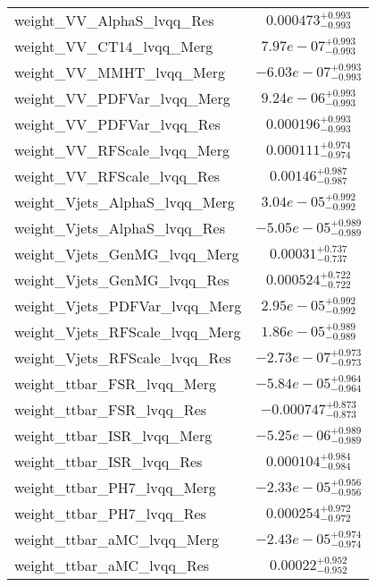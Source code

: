 \begin{tabular}{|l|c|}
weight\_VV\_AlphaS\_lvqq\_Res & $0.000473^{+0.993}_{-0.993}$ \\
weight\_VV\_CT14\_lvqq\_Merg & $7.97e-07^{+0.993}_{-0.993}$ \\
weight\_VV\_MMHT\_lvqq\_Merg & $-6.03e-07^{+0.993}_{-0.993}$ \\
weight\_VV\_PDFVar\_lvqq\_Merg & $9.24e-06^{+0.993}_{-0.993}$ \\
weight\_VV\_PDFVar\_lvqq\_Res & $0.000196^{+0.993}_{-0.993}$ \\
weight\_VV\_RFScale\_lvqq\_Merg & $0.000111^{+0.974}_{-0.974}$ \\
weight\_VV\_RFScale\_lvqq\_Res & $0.00146^{+0.987}_{-0.987}$ \\
weight\_Vjets\_AlphaS\_lvqq\_Merg & $3.04e-05^{+0.992}_{-0.992}$ \\
weight\_Vjets\_AlphaS\_lvqq\_Res & $-5.05e-05^{+0.989}_{-0.989}$ \\
weight\_Vjets\_GenMG\_lvqq\_Merg & $0.00031^{+0.737}_{-0.737}$ \\
weight\_Vjets\_GenMG\_lvqq\_Res & $0.000524^{+0.722}_{-0.722}$ \\
weight\_Vjets\_PDFVar\_lvqq\_Merg & $2.95e-05^{+0.992}_{-0.992}$ \\
weight\_Vjets\_RFScale\_lvqq\_Merg & $1.86e-05^{+0.989}_{-0.989}$ \\
weight\_Vjets\_RFScale\_lvqq\_Res & $-2.73e-07^{+0.973}_{-0.973}$ \\
weight\_ttbar\_FSR\_lvqq\_Merg & $-5.84e-05^{+0.964}_{-0.964}$ \\
weight\_ttbar\_FSR\_lvqq\_Res & $-0.000747^{+0.873}_{-0.873}$ \\
weight\_ttbar\_ISR\_lvqq\_Merg & $-5.25e-06^{+0.989}_{-0.989}$ \\
weight\_ttbar\_ISR\_lvqq\_Res & $0.000104^{+0.984}_{-0.984}$ \\
weight\_ttbar\_PH7\_lvqq\_Merg & $-2.33e-05^{+0.956}_{-0.956}$ \\
weight\_ttbar\_PH7\_lvqq\_Res & $0.000254^{+0.972}_{-0.972}$ \\
weight\_ttbar\_aMC\_lvqq\_Merg & $-2.43e-05^{+0.974}_{-0.974}$ \\
weight\_ttbar\_aMC\_lvqq\_Res & $0.00022^{+0.952}_{-0.952}$ \\
\hline
\end{tabular}
